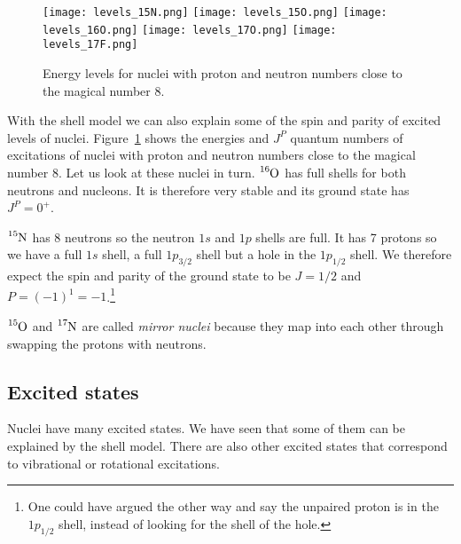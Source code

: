\documentclass[12pt]{article}
\begin{document}
\begin{figure}
\begin{center}
\texttt{[image: levels\_15N.png]}
\texttt{[image: levels\_15O.png]}
\texttt{[image: levels\_16O.png]}
\texttt{[image: levels\_17O.png]}
\texttt{[image: levels\_17F.png]}
\caption{Energy levels for nuclei with proton and neutron numbers close to the magical number 8.}\label{fig:levelsNOOOF}
\end{center}
\end{figure}

With the shell model we can also explain some of the spin and parity of excited levels of nuclei. Figure~\ref{fig:levelsNOOOF} shows the energies and $J^P$ quantum numbers of excitations of nuclei with proton and neutron numbers close to the magical number $8$. Let us look at these nuclei in turn. $\ce{^{16}O}$ has full shells for both neutrons and nucleons. It is therefore very stable and its ground state has $J^P=0^+$.

$\ce{^{15}N}$ has 8 neutrons so the neutron $1s$ and $1p$ shells are full. It has 7 protons so we have a full $1s$ shell, a full $1p_{3/2}$ shell but a hole in the $1p_{1/2}$ shell. We therefore expect the spin and parity of the ground state to be $J=1/2$ and $P=(-1)^1=-1$.\footnote{One could have argued the other way and say the unpaired proton is in the $1p_{1/2}$ shell, instead of looking for the shell of the hole.}

$\ce{^{15}O}$ and $\ce{^{17}N}$ are called \emph{mirror nuclei} because they map into each other through swapping the protons with neutrons.
%
%
%
\subsection{Excited states}
%
%
%
Nuclei have many excited states. We have seen that some of them can be explained by the shell model. There are also other excited states that correspond to vibrational or rotational excitations. 
\end{document}
